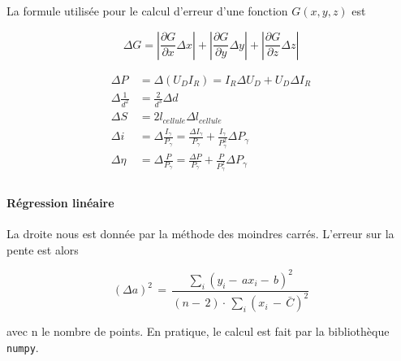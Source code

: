 La formule utilisée pour le calcul d'erreur d'une fonction \(G(x,y,z)\) est \cite{erreursmesure}

\begin{equation*}
    \Delta G = \left|\frac{\partial{G}}{\partial{x}}\Delta x\right| + \left|\frac{\partial{G}}{\partial{y}}\Delta y\right| + \left|\frac{\partial{G}}{\partial{z}}\Delta z\right|
\end{equation*}

\begin{align*}
    \Delta P &= \Delta (U_D I_R) = I_R \Delta U_D + U_D \Delta I_R \\
    \Delta \frac{1}{d^2} &= \frac{2}{d^3}\Delta d \\
    \Delta S &= 2 l_{cellule} \Delta l_{cellule} \\
    \Delta i &= \Delta \frac{I_\gamma}{P_\gamma} = \frac{\Delta I_\gamma}{P_\gamma} + \frac{I_\gamma}{P_\gamma^2} \Delta P_\gamma \\
    \Delta \eta &= \Delta \frac{P}{P_\gamma} = \frac{\Delta P}{P_\gamma} + \frac{P}{P_\gamma^2} \Delta P_\gamma \\
\end{align*}

\paragraph*{Régression linéaire}
La droite nous est donnée par la méthode des moindres carrés. L'erreur sur la pente est alors

\[ \left(\Delta{a}\right)^{2}\,=\,{\frac{\sum_{i}(y_{i}-\,a{x}_{i}-\,b)^{2}}{\left(n-\,2\right)\cdot\,\sum_{i}({x}_{i}\,-\,\bar{C})^{2}}} \]

avec n le nombre de points. En pratique, le calcul est fait par la bibliothèque \texttt{numpy}.
